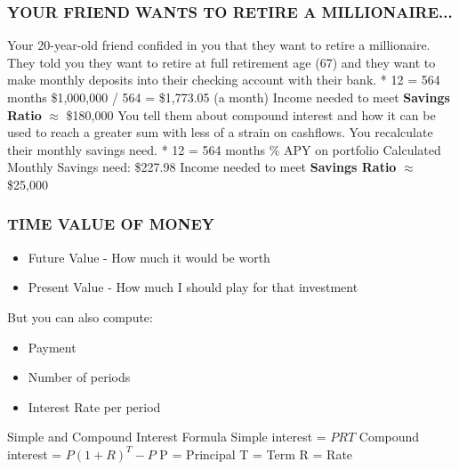 \documentclass[12pt]{article}
\begin{document}
            \subsubsection{YOUR FRIEND WANTS TO RETIRE A MILLIONAIRE...}
                Your 20-year-old friend confided in you that they want to retire a millionaire. They told you they
                want to retire at full retirement age (67) and they want to make monthly deposits into their checking
                account with their bank.
                 * 12 = 564 months
                \newline \$1,000,000 / 564 = \$1,773.05 (a month)
                \newline Income needed to meet \textbf{Savings Ratio} $\approx$ \$180,000
                \newline
                \newline You tell them about compound interest and how it can be used to reach a greater sum with less
                of a strain on cashflows. You recalculate their monthly savings need.
                 * 12 = 564 months
                \% APY on portfolio
                \newline Calculated Monthly Savings need: \$227.98
                \newline Income needed to meet \textbf{Savings Ratio} $\approx$ \$25,000
            \subsubsection{TIME VALUE OF MONEY}
                \begin{itemize}
                    \item Future Value - How much it would be worth
                    \item Present Value - How much I should play for that investment
                \end{itemize}
                But you can also compute:
                \begin{itemize}
                    \item Payment
                    \item Number of periods
                    \item Interest Rate per period
                \end{itemize}
                Simple and Compound Interest Formula
                \newline Simple interest = $PRT$
                \newline Compound interest = $P(1+R)^T - P$
                \newline P = Principal
                \newline T = Term           
                \newline R = Rate
\end{document}
